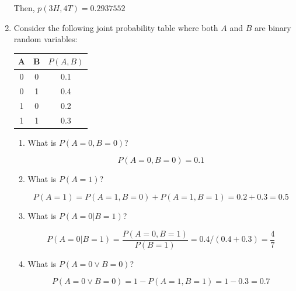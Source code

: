 \documentclass[a4paper]{article}
\theoremstyle{definition}
\newenvironment{soln}{
    \leavevmode\color{blue}\ignorespaces
}{}
\begin{document}
\begin{enumerate}
\begin{soln}
	    Then, $p(3H,4T) = 0.2937552$
	    \end{soln}
	\item 	Consider the following joint probability table where both $A$ and $B$ are binary random variables: 
\begin{table}[htb]
\centering
	\begin{tabular}{ccc}\hline
	A & B & $P(A, B)$  \\\hline
	0 & 0 & 0.1 \\
	0 & 1 & 0.4 \\
	1 & 0 & 0.2 \\
	1 & 1 & 0.3 \\\hline
	\end{tabular}
\end{table}
\begin{enumerate}
	\item 	What is $P(A = 0, B = 0)$?\\
	    \begin{soln} 
	    $$P(A = 0, B = 0) = 0.1$$
	    \end{soln}
	\item 	What is $P(A = 1)$?\\
	    \begin{soln}
	    $$P(A = 1) = P(A = 1, B = 0) + P(A = 1, B = 1) = 0.2 + 0.3 = 0.5$$
	    \end{soln}
	\item 	What is $P(A = 0 | B = 1)$?\\
	    \begin{soln}
	    $$P(A = 0 | B = 1) = \frac{P(A = 0, B = 1)}{P(B = 1)} = 0.4/(0.4 + 0.3) = \frac{4}{7}$$
	    \end{soln}
	\item 	What is $P(A = 0 \vee B = 0 )$?\\
	    \begin{soln}
	    $$P(A = 0 \vee B = 0) = 1 - P(A = 1, B = 1) = 1 - 0.3 = 0.7$$
	    \end{soln}
\end{enumerate}
\end{enumerate}
\end{document}
